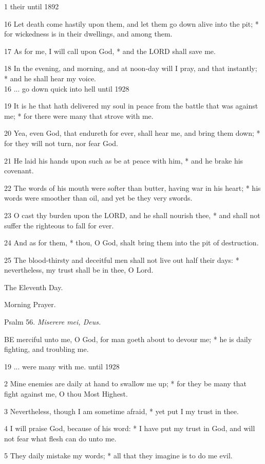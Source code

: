 1 their until
1892

16 Let death come hastily upon them, and let them go down alive into the
pit; * for wickedness is in their dwellings, and among them.

17 As for me, I will call upon God, * and the LORD shall
save me.

18 In the evening, and morning, and at noon-day will
I pray, and that instantly; * and he shall hear my voice. \\
16 ... go down
quick into hell
until 1928

19 It is he that hath delivered my soul in peace from the battle
that was against me; * for there were many that strove with me.

20 Yea, even God, that endureth for ever, shall hear
me, and bring them down; * for they will not turn, nor fear God.

21 He laid his hands upon such as be at peace with
him, * and he brake his covenant.

22 The words of his mouth were softer than butter,
having war in his heart; * his words were smoother than oil, and yet be
they very swords.

23 O cast thy burden upon the LORD, and he shall nourish
thee, * and shall not suffer the righteous to fall for ever.

24 And as for them, * thou, O God, shalt bring them
into the pit of destruction.

25 The blood-thirsty and deceitful men shall not live
out half their days: * nevertheless, my trust shall be in thee, O Lord.

The
Eleventh Day.

Morning
Prayer.

Psalm
56. \emph{Miserere mei, Deus.}

BE
merciful unto me, O God, for man goeth about to devour me; * he is daily
fighting, and troubling me.

19 ... were many with me. until
1928

2 Mine enemies are daily at hand to swallow me up; * for they be many that
fight against me, O thou Most Highest.

3 Nevertheless, though I am sometime afraid, * yet put
I my trust in thee.

4 I will praise God, because of his word: * I have put
my trust in God, and will not fear what flesh can do unto me.

5 They daily mistake my words; * all that they imagine
is to do me evil.

